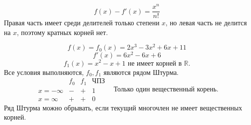 \documentclass[12pt]{article}
\begin{document}
$$f(x) - f'(x) = \frac{x^n}{n!}$$
\indent Правая часть имеет среди делителей только степени $x$, но левая часть не делится на $x$, поэтому кратных корней нет.
\begin{examp}
$$f(x) = f_0(x) = 2x^3 - 3x^2 + 6x + 11$$
$$f'(x) = 6x^2 - 6x + 6$$
$$f_1(x) = x^2 - x + 1  \text{ не имеет корней в }\mathbb{R}.$$
\indent Все условия выполняются, $f_0, f_1$ являются рядом Штурма. \\
$$\begin{array}{c|c|c|c}
  & f_0 & f_1 & \textit{ЧПЗ} \\ \hline
x = -\infty & - & + & 1\\ \hline
x = \infty & + & + & 0
\end{array}
~~~~\text{Только один вещественный корень.}$$
\indent Ряд Штурма можно обрывать, если текущий многочлен не имеет вещественных корней.
\end{examp}
\end{document}
